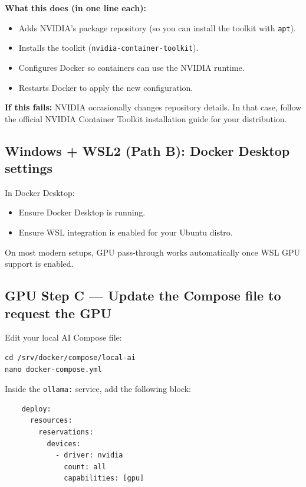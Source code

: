 \textbf{What this does (in one line each):}
\begin{itemize}[leftmargin=*]
  \item Adds NVIDIA’s package repository (so you can install the toolkit with \texttt{apt}).
  \item Installs the toolkit (\texttt{nvidia-container-toolkit}).
  \item Configures Docker so containers can use the NVIDIA runtime.
  \item Restarts Docker to apply the new configuration.
\end{itemize}

\textbf{If this fails:} NVIDIA occasionally changes repository details.
In that case, follow the official NVIDIA Container Toolkit installation guide for your distribution.



\subsection*{Windows + WSL2 (Path B): Docker Desktop settings}
In Docker Desktop:
\begin{itemize}[leftmargin=*]
  \item Ensure Docker Desktop is running.
  \item Ensure WSL integration is enabled for your Ubuntu distro.
\end{itemize}
On most modern setups, GPU pass-through works automatically once WSL GPU support is enabled.

\subsection{GPU Step C --- Update the Compose file to request the GPU}
Edit your local AI Compose file:
\begin{lstlisting}
cd /srv/docker/compose/local-ai
nano docker-compose.yml
\end{lstlisting}

Inside the \texttt{ollama:} service, add the following block:

\begin{lstlisting}
    deploy:
      resources:
        reservations:
          devices:
            - driver: nvidia
              count: all
              capabilities: [gpu]
\end{lstlisting}

